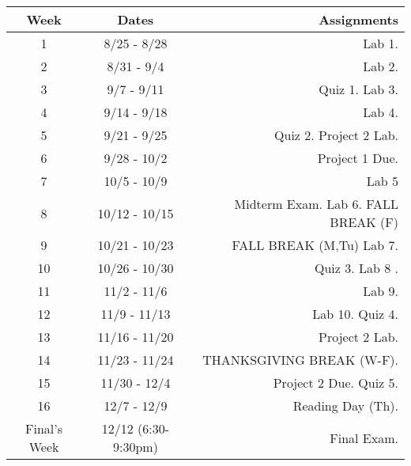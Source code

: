 \documentclass[10pt]{article}
\begin{document}
\begin{center}
\begin{tabular}{|c|c|r|}
\hline 
Week & Dates & Assignments \\
\hline
1 & 8/25 - 8/28 &  Lab 1. \\
\hline 
2 & 8/31 - 9/4 &   Lab 2. \\
\hline
3 & 9/7 - 9/11 &   Quiz 1. Lab 3.\\
\hline
4 & 9/14 - 9/18 &  Lab 4. \\
\hline
5 & 9/21 - 9/25 &  Quiz 2. Project 2 Lab.\\
\hline
6 & 9/28 - 10/2 & Project 1 Due.\\
\hline
7 & 10/5 - 10/9  &  Lab 5\\
\hline 
8 & 10/12 - 10/15 &  Midterm Exam. Lab 6. FALL BREAK (F) \\
\hline
9 & 10/21 - 10/23 & FALL BREAK (M,Tu) Lab 7. \\
\hline
10 & 10/26 - 10/30 &  Quiz 3. Lab 8 .\\
\hline
11 & 11/2 - 11/6 & Lab 9.\\
\hline
12 & 11/9 - 11/13 & Lab 10. Quiz 4.\\
\hline
13 & 11/16 - 11/20 & Project 2 Lab.\\ 
\hline
14 & 11/23 - 11/24 &  THANKSGIVING BREAK (W-F).   \\
\hline
15 & 11/30 - 12/4 & Project 2 Due. Quiz 5.\\ 
\hline
16 & 12/7 - 12/9 &   Reading Day (Th). \\
\hline
Final's Week & 12/12 (6:30-9:30pm) & Final Exam. \\ 
\hline
\end{tabular}
\end{center}
\end{document}
